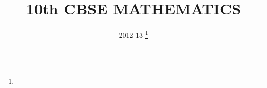 \documentclass[journal,12pt,twocolumn]{IEEEtran}
\DeclareMathOperator*{\Res}{Res}
\begin{document}
\newtheorem{theorem}{Theorem}[section]
\newtheorem{problem}{Problem}
\newtheorem{proposition}{Proposition}[section]
\newtheorem{lemma}{Lemma}[section]
\newtheorem{corollary}[theorem]{Corollary}
\newtheorem{example}{Example}[section]
\newtheorem{definition}[problem]{Definition}
\newcommand{\BEQA}{\begin{eqnarray}}
\newcommand{\EEQA}{\end{eqnarray}}
\newcommand{\define}{\stackrel{\triangle}{=}}

\providecommand{\mbf}{\mathbf}
\providecommand{\pr}[1]{\ensuremath{\Pr\left(#1\right)}}
\providecommand{\qfunc}[1]{\ensuremath{Q\left(#1\right)}}
\providecommand{\sbrak}[1]{\ensuremath{{}\left[#1\right]}}
\providecommand{\lsbrak}[1]{\ensuremath{{}\left[#1\right.}}
\providecommand{\rsbrak}[1]{\ensuremath{{}\left.#1\right]}}
\providecommand{\brak}[1]{\ensuremath{\left(#1\right)}}
\providecommand{\lbrak}[1]{\ensuremath{\left(#1\right.}}
\providecommand{\rbrak}[1]{\ensuremath{\left.#1\right)}}
\providecommand{\cbrak}[1]{\ensuremath{\left\{#1\right\}}}
\providecommand{\lcbrak}[1]{\ensuremath{\left\{#1\right.}}
\providecommand{\rcbrak}[1]{\ensuremath{\left.#1\right\}}}
\theoremstyle{remark}
\newtheorem{rem}{Remark}
\newcommand{\sgn}{\mathop{\mathrm{sgn}}}
\providecommand{\abs}[1]{\left\vert#1\right\vert}
\providecommand{\res}[1]{\Res\displaylimits_{#1}} 
\providecommand{\norm}[1]{\left\lVert#1\right\rVert}
\providecommand{\mtx}[1]{\mathbf{#1}}
\providecommand{\mean}[1]{E\left[ #1 \right]}
\providecommand{\fourier}{\overset{\mathcal{F}}{ \rightleftharpoons}}
\providecommand{\system}{\overset{\mathcal{H}}{ \longleftrightarrow}}
\newcommand{\solution}{\noindent \textbf{Solution: }}
\newcommand{\cosec}{\,\text{cosec}\,}
\providecommand{\dec}[2]{\ensuremath{\overset{#1}{\underset{#2}{\gtrless}}}}
\newcommand{\myvec}[1]{\ensuremath{\begin{pmatrix}#1\end{pmatrix}}}
\newcommand{\mydet}[1]{\ensuremath{\begin{vmatrix}#1\end{vmatrix}}}
\makeatletter
{}
\makeatother
\let\StandardTheFigure\thefigure
\let\vec\mathbf
\renewcommand{\thefigure}{\theproblem}
\def\putbox#1#2#3{\makebox[0in][l]{\makebox[#1][l]{}\raisebox{\baselineskip}[0in][0in]{\raisebox{#2}[0in][0in]{#3}}}}
     \def\rightbox#1{\makebox[0in][r]{#1}}
     \def\centbox#1{\makebox[0in]{#1}}
     \def\topbox#1{\raisebox{-\baselineskip}[0in][0in]{#1}}
     \def\midbox#1{\raisebox{-0.5\baselineskip}[0in][0in]{#1}}
\vspace{3cm}
\title{
	10th CBSE MATHEMATICS
}
\author{ 2012-13
	\thanks{}
	
}
\maketitle
\newpage
\bigskip
\renewcommand{\thefigure}{\theenumi}
\renewcommand{\thetable}{\theenumi}
\end{document}
